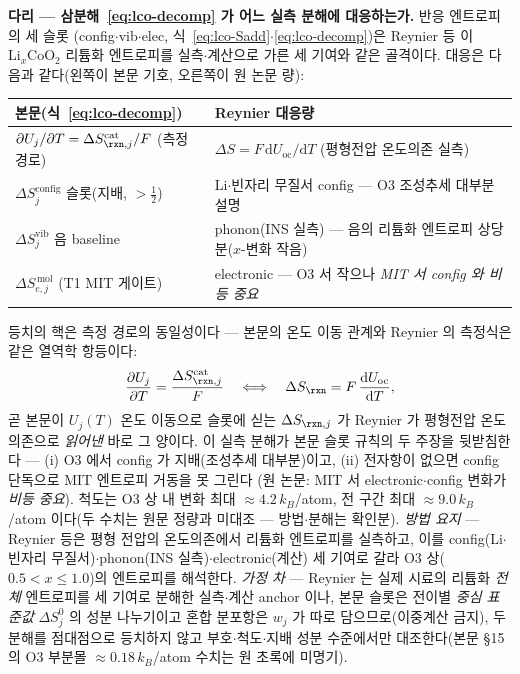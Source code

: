 \begin{srcbox}
\textbf{다리 --- 삼분해~\eqref{eq:lco-decomp} 가 어느 실측 분해에 대응하는가.} 반응 엔트로피의 세 슬롯
(config$\cdot$vib$\cdot$elec, 식~\eqref{eq:lco-Sadd}$\cdot$\eqref{eq:lco-decomp})은 Reynier
등\cite{reynier2004} 이 $\mathrm{Li}_x\mathrm{CoO_2}$ 리튬화 엔트로피를 실측$\cdot$계산으로 가른 세 기여와
같은 골격이다. 대응은 다음과 같다(왼쪽이 본문 기호, 오른쪽이 원 논문 량):
\begin{center}\footnotesize
\begin{tabular}{@{}ll@{}}
\hline
본문(식~\eqref{eq:lco-decomp}) & Reynier\cite{reynier2004} 대응량 \\
\hline
$\partial U_j/\partial T=\Delta S_{\rxn,j}^\mathrm{cat}/F$ (측정 경로) & $\Delta S=F\,\mathrm dU_\mathrm{oc}/\mathrm dT$ (평형전압 온도의존 실측) \\
$\Delta S_j^\mathrm{config}$ 슬롯(지배, $>\tfrac12$) & Li$\cdot$빈자리 무질서 config --- O3 조성추세 대부분 설명 \\
$\Delta S_j^\mathrm{vib}$ 음 baseline & phonon(INS 실측) --- 음의 리튬화 엔트로피 상당분($x$-변화 작음) \\
$\Delta S_{e,j}^{\,\mathrm{mol}}$ (T1 MIT 게이트) & electronic --- O3 서 작으나 \emph{MIT 서 config 와 비등 중요} \\
\hline
\end{tabular}
\end{center}
등치의 핵은 측정 경로의 동일성이다 --- 본문의 온도 이동 관계와 Reynier 의 측정식은 같은 열역학
항등이다:
\begin{equation}
\frac{\partial U_j}{\partial T}=\frac{\Delta S_{\rxn,j}^\mathrm{cat}}{F}
\quad\Longleftrightarrow\quad
\Delta S_{\rxn}=F\,\frac{\mathrm dU_\mathrm{oc}}{\mathrm dT},
\label{eq:br-reynier2004-1}
\end{equation}
곧 본문이 $U_j(T)$ 온도 이동으로 슬롯에 싣는 $\Delta S_{\rxn,j}$ 가 Reynier 가 평형전압 온도의존으로
\emph{읽어낸} 바로 그 양이다. 이 실측 분해가 본문 슬롯 규칙의 두 주장을 뒷받침한다 --- (i) O3 에서
config 가 지배(조성추세 대부분)이고, (ii) 전자항이 없으면 config 단독으로 MIT 엔트로피 거동을 못 그린다
(원 논문: MIT 서 electronic$\cdot$config 변화가 \emph{비등 중요}). 척도는 O3 상 내 변화 최대
$\approx4.2\,k_B$/atom, 전 구간 최대 $\approx9.0\,k_B$/atom 이다(두 수치는 원문 정량과 미대조 --- 방법$\cdot$분해는 확인분). \emph{방법 요지} --- Reynier 등은 평형
전압의 온도의존에서 리튬화 엔트로피를 실측하고, 이를 config(Li$\cdot$빈자리 무질서)$\cdot$phonon(INS
실측)$\cdot$electronic(계산) 세 기여로 갈라 O3 상($0.5{<}x{\le}1.0$)의 엔트로피를 해석한다. \emph{가정
차} --- Reynier 는 실제 시료의 리튬화 \emph{전체} 엔트로피를 세 기여로 분해한 실측$\cdot$계산 anchor 이나,
본문 슬롯은 전이별 \emph{중심 표준값} $\Delta S_j^0$ 의 성분 나누기이고 혼합 분포항은 $w_j$ 가 따로
담으므로(이중계산 금지), 두 분해를 점대점으로 등치하지 않고 부호$\cdot$척도$\cdot$지배 성분 수준에서만
대조한다(본문 §15 의 O3 부분몰 $\approx0.18\,k_B$/atom 수치는 원 초록에 미명기).
\end{srcbox}

